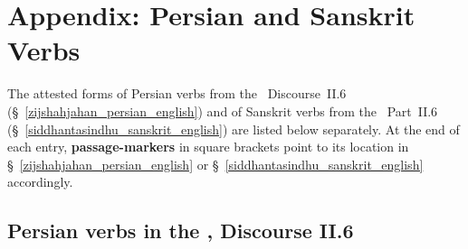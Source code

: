 \appendix
\OnehalfSpacing

\section*{Appendix: Persian and Sanskrit Verbs}\label{Appendix_verbs}

The attested forms of Persian verbs from the \ZijiShahJahani\ Discourse~II.6 (\S~\ref{zijshahjahan_persian_english}) and of Sanskrit verbs from the \Siddhantasindhu\ Part~II.6 (\S~\ref{siddhantasindhu_sanskrit_english}) are listed below separately. At the end of each entry, \textbf{passage-markers} in square brackets point to its location in \S~\ref{zijshahjahan_persian_english} or \S~\ref{siddhantasindhu_sanskrit_english} accordingly.

\subsection*{Persian verbs in the \ZijiShahJahani, Discourse II.6} \label{persian_verbs}

